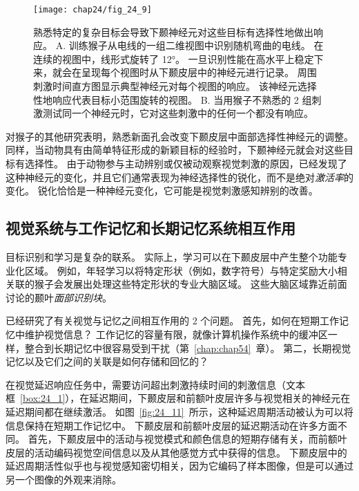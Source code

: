 \begin{figure}[htbp]
	\centering
	\texttt{[image: chap24/fig\_24\_9]}
	\caption{熟悉特定的复杂目标会导致下颞神经元对这些目标有选择性地做出响应。
		A. 训练猴子从电线的一组二维视图中识别随机弯曲的电线。 在连续的视图中，线形式旋转了 12°。
		一旦识别性能在高水平上稳定下来，就会在呈现每个视图时从下颞皮层中的神经元进行记录。
		周围刺激时间直方图显示典型神经元对每个视图的响应。
		该神经元选择性地响应代表目标小范围旋转的视图。
		B. 当用猴子不熟悉的 2 组刺激测试同一个神经元时，它对这些刺激中的任何一个都没有响应。}
	\label{fig:24_9}
\end{figure}


对猴子的其他研究表明，熟悉新面孔会改变下颞皮层中面部选择性神经元的调整。
同样，当动物具有由简单特征形成的新颖目标的经验时，下颞神经元就会对这些目标有选择性。
由于动物参与主动辨别或仅被动观察视觉刺激的原因，已经发现了这种神经元的变化，并且它们通常表现为神经选择性的锐化，而不是绝对\textit{激活率}的变化。
锐化恰恰是一种神经元变化，它可能是视觉刺激感知辨别的改善。



\subsection{视觉系统与工作记忆和长期记忆系统相互作用}

目标识别和学习是复杂的联系。
实际上，学习可以在下颞皮层中产生整个功能专业化区域。
例如，年轻学习以将特定形状（例如，数字符号）与特定奖励大小相关联的猴子会发展出处理这些特定形状的专业大脑区域。
这些大脑区域靠近前面讨论的颞叶\textit{面部识别块}。


已经研究了有关视觉与记忆之间相互作用的 2 个问题。
首先，如何在短期工作记忆中维护视觉信息？
工作记忆的容量有限，就像计算机操作系统中的缓冲区一样，整合到长期记忆中很容易受到干扰（第~\ref{chap:chap54}~章）。
第二，长期视觉记忆以及它们之间的关联是如何存储和回忆的？


在视觉延迟响应任务中，需要访问超出刺激持续时间的刺激信息（文本框~\ref{box:24_1}），在延迟期间，下颞皮层和前额叶皮层许多与视觉相关的神经元在延迟期间都在继续激活。
如图~\ref{fig:24_11}~所示，这种延迟周期活动被认为可以将信息保持在短期工作记忆中。
下颞皮层和前额叶皮层的延迟期活动在许多方面不同。
首先，下颞皮层中的活动与视觉模式和颜色信息的短期存储有关，而前额叶皮层的活动编码视觉空间信息以及从其他感觉方式中获得的信息。
下颞皮层中的延迟周期活性似乎也与视觉感知密切相关，因为它编码了样本图像，但是可以通过另一个图像的外观来消除。


